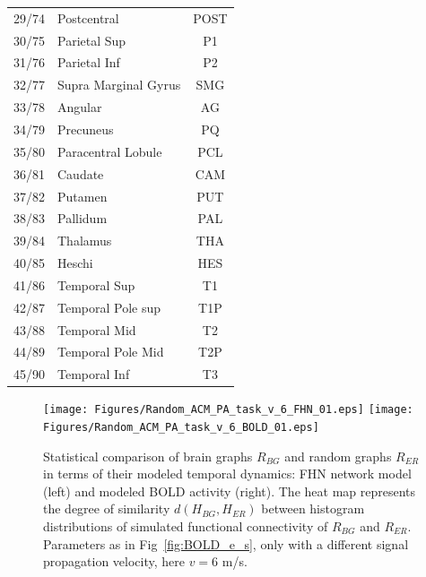 \documentclass[fleqn,10pt]{wlpeerj}
\newcommand{\red}[1]{\textcolor{red}{(#1)}}
\newcommand{\reg}[1]{~ \\ \textcolor{red}{\framebox{\begin{minipage}{0.9\linewidth}\footnotesize\em
#1  \end{minipage}}}\\}
\begin{document}
\begin{table}[htbp]
\begin{tabular}{l | l | c}
29/74 & Postcentral        &   POST\\
30/75 & Parietal Sup       &       P1\\
31/76 & Parietal Inf       &       P2\\
32/77 & Supra Marginal Gyrus  &  SMG\\
33/78 & Angular               &   AG\\
34/79 & Precuneus             &   PQ\\
35/80 & Paracentral Lobule    & PCL\\
36/81 & Caudate               & CAM\\
37/82 & Putamen               & PUT\\
38/83 & Pallidum              &  PAL\\
39/84 & Thalamus              & THA\\
40/85 & Heschi                &  HES\\
41/86 & Temporal Sup          &    T1\\
42/87 & Temporal Pole sup     &  T1P\\
43/88 & Temporal Mid          &    T2\\
44/89 & Temporal Pole Mid     &  T2P\\
45/90 & Temporal Inf          &    T3\\
\hline  
  \hline 
\end{tabular}
\end{table}

\clearpage

\begin{figure}[htp] \centering
	 \texttt{[image: Figures/Random\_ACM\_PA\_task\_v\_6\_FHN\_01.eps]} 
	 \texttt{[image: Figures/Random\_ACM\_PA\_task\_v\_6\_BOLD\_01.eps]} 
   	 \caption{Statistical comparison of brain graphs $R_{BG}$ and random graphs $R_{ER}$ in terms of their
modeled temporal dynamics: FHN network model (left) and modeled BOLD activity (right). The heat map represents the
degree of similarity $d\left(H_{BG}, H_{ER}\right)$ between histogram distributions of simulated functional connectivity
of $R_{BG}$ and $R_{ER}$. Parameters as in Fig~\ref{fig:BOLD_e_s}, only with a different signal propagation velocity, here $v=6$ m/s.\\
} 
    \label{fig:BG_vs_RG}
\end{figure} 

\end{document}
